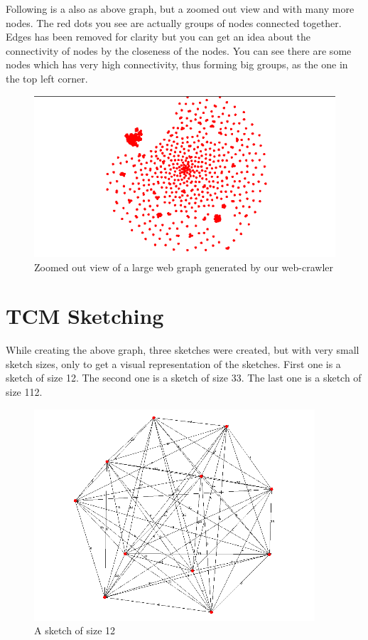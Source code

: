 \documentclass[12pt]{report}
\numberwithin{figure}{section}
\numberwithin{table}{section}
\begin{document}
Following is a also as above graph, but a zoomed out view and with many more nodes. The red dots you see are actually groups of nodes connected together. Edges has been removed for clarity but you can get an idea about the connectivity of nodes by the closeness of the nodes. You can see there are some nodes which has very high connectivity, thus forming big groups, as the one in the top left corner. 

\begin{figure}[H]
\centering
\includegraphics[scale=0.8]{images/graph2}
\caption[Zoomed out view of a large web graph]{Zoomed out view of a large web graph generated by our web-crawler}
\end{figure}

\section{TCM Sketching}
While creating the above graph, three sketches were created, but with very small sketch sizes, only to get a visual representation of the sketches. First one is a sketch of size 12. The second one is a sketch of size 33. The last one is a sketch of size 112.


\begin{figure}[H]
\centering
\includegraphics[scale=0.8]{images/s1}
\caption{A sketch of size 12}
\end{figure}
\end{document}
